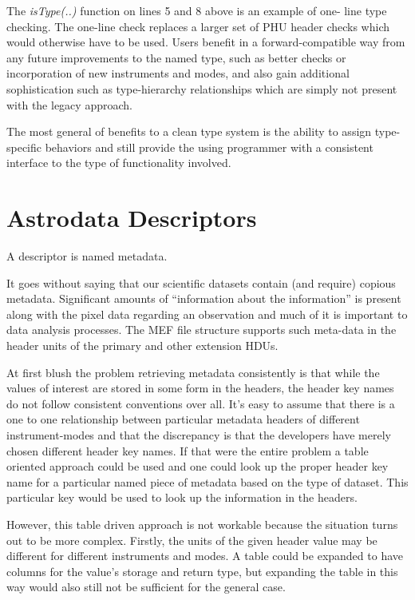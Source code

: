 \documentclass[letterpaper,10pt,english]{sphinxmanual}
\begin{document}
The \emph{isType(..)} function on lines 5 and 8 above is an example of one-
line type checking. The one-line check replaces a larger set of PHU
header checks which would otherwise have to be used. Users benefit in
a forward-compatible way from any future improvements to the named
type, such as better checks or incorporation of new instruments and
modes, and also gain additional sophistication such as type-hierarchy
relationships which are simply not present with the legacy approach.

The most general of benefits to a clean type system is the ability to
assign type-specific behaviors and still provide the using programmer
with a consistent interface to the type of functionality involved.


\section{Astrodata Descriptors}
\label{gen.ADMANUAL_ADConcepts:astrodata-descriptors}
A descriptor is named metadata.

It goes without saying that our scientific datasets contain (and
require) copious metadata. Significant amounts of ``information about
the information'' is present along with the pixel data regarding an
observation and much of it is important to data analysis processes.
The MEF file structure supports such meta-data in
the header units of the primary and other extension HDUs.

At first blush the problem retrieving metadata consistently is that
while the values of interest are stored in some form in the headers,
the header key names do not follow consistent conventions over all.
It's easy to assume that there is a one to one relationship between
particular metadata headers of different instrument-modes and that the
discrepancy is that the developers have merely chosen different header
key names. If that were the entire problem a table oriented approach
could be used and one could look up the proper header key name for a
particular named piece of metadata based on the type of dataset. This
particular key would be used to look up the information in the
headers.

However, this table driven approach is not workable because the
situation turns out to be more complex. Firstly, the units of the
given header value may be different for different instruments and
modes. A table could be expanded to have columns for the value's
storage and return type, but expanding the table in this way would
also still not be sufficient for the general case.
\end{document}
